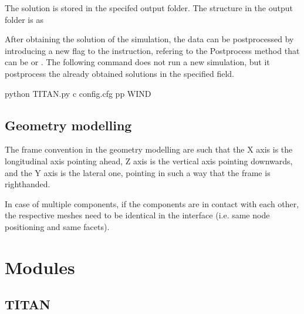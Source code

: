 \documentclass[letterpaper,10pt,english]{sphinxmanual}
\begin{document}
\sphinxAtStartPar
The solution is stored in the specifed output folder. The structure in the output folder is as 

\sphinxAtStartPar
After obtaining the solution of the simulation, the data can be postprocessed by introducing a new flag to the instruction, refering to the Postprocess method that can be  or . The following command does not run a new simulation, but it postprocess the already obtained solutions in the  specified field.

\begin{sphinxVerbatim}[commandchars=\\\{\}]
 python TITAN.py \PYGZhy{}c config.cfg \PYGZhy{}pp WIND
\end{sphinxVerbatim}


\section{Geometry modelling}
\label{\detokenize{usage:geometry-modelling}}
\sphinxAtStartPar
The frame convention in the geometry modelling are such that the X axis is the longitudinal axis pointing ahead, Z axis is the vertical axis pointing downwards, and the Y axis is the lateral one, pointing in such a way that the frame is right\sphinxhyphen{}handed.

\sphinxAtStartPar
In case of multiple components, if the components are in contact with each other, the respective meshes need to be identical in the interface (i.e. same node positioning and same facets).

\sphinxstepscope


\chapter{Modules}
\label{\detokenize{modules:modules}}\label{\detokenize{modules::doc}}

\section{TITAN}
\label{\detokenize{modules:titan}}
\end{document}
